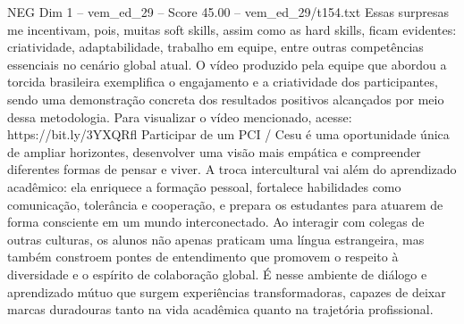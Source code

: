 \begin{textsample}{NEG Dim 1 – vem\_ed\_29 – Score 45.00 – vem\_ed\_29/t154.txt}
Essas surpresas me incentivam, pois, muitas soft skills, assim como as hard skills, ficam evidentes: criatividade, adaptabilidade, trabalho em equipe, entre outras competências essenciais no cenário global atual.
O vídeo produzido pela equipe que abordou a torcida brasileira exemplifica o engajamento e a criatividade dos participantes, sendo uma demonstração concreta dos resultados positivos alcançados por meio dessa metodologia.
Para visualizar o vídeo mencionado, acesse: https://bit.ly/3YXQRfl Participar de um PCI / Cesu é uma oportunidade única de ampliar horizontes, desenvolver uma visão mais empática e compreender diferentes formas de pensar e viver.
A troca intercultural vai além do aprendizado acadêmico: ela enriquece a formação pessoal, fortalece habilidades como comunicação, tolerância e cooperação, e prepara os estudantes para atuarem de forma consciente em um mundo interconectado.
Ao interagir com colegas de outras culturas, os alunos não apenas praticam uma língua estrangeira, mas também constroem pontes de entendimento que promovem o respeito à diversidade e o espírito de colaboração global.
É nesse ambiente de diálogo e aprendizado mútuo que surgem experiências transformadoras, capazes de deixar marcas duradouras tanto na vida acadêmica quanto na trajetória profissional.

\end{textsample}
